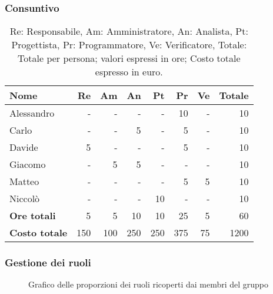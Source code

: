 \subsubsection{Consuntivo}

\begin{table}[H]
	\centering
	\begin{tabular}{l|r|r|r|r|r|r|r}
		\textbf{Nome}         & \textbf{Re} & \textbf{Am} & \textbf{An} & \textbf{Pt} & \textbf{Pr} & \textbf{Ve} & \textbf{Totale} \\
		\hline
		Alessandro            & -           & -           & -           & -           & 10          & -           & 10              \\
		Carlo                 & -           & -           & 5           & -           & 5           & -           & 10              \\
		Davide                & 5           & -           & -           & -           & 5           & -           & 10              \\
		Giacomo               & -           & 5           & 5           & -           & -           & -           & 10              \\
		Matteo                & -           & -           & -           & -           & 5           & 5           & 10              \\
		Niccolò               & -           & -           & -           & 10          & -           & -           & 10              \\
		\hline
		\textbf{Ore totali}   & 5           & 5           & 10          & 10          & 25          & 5           & 60              \\
		\textbf{Costo totale} & 150         & 100         & 250         & 250         & 375         & 75          & 1200
	\end{tabular}
	\caption{Re: Responsabile, Am: Amministratore, An: Analista, Pt: Progettista,
		Pr: Programmatore, Ve: Verificatore, Totale: Totale per persona; valori espressi in ore; Costo totale espresso in euro.}
\end{table}

\subsubsection{Gestione dei ruoli}

\begin{figure}[h]
	\centering
	\caption{Grafico delle proporzioni dei ruoli ricoperti dai membri del gruppo}
\end{figure}

